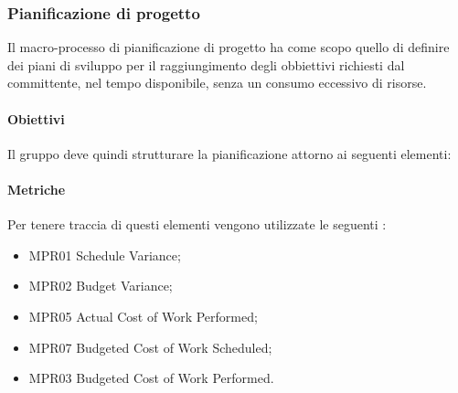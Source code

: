 \subsubsection{Pianificazione di progetto}
Il macro-processo di pianificazione di progetto ha come scopo quello di definire dei piani di sviluppo per il raggiungimento degli obbiettivi richiesti dal committente, nel tempo disponibile, senza un consumo eccessivo di risorse.

\paragraph{Obiettivi}
Il gruppo \gruppo{} deve quindi strutturare la pianificazione attorno ai seguenti elementi:

\paragraph{Metriche}%
Per tenere traccia di questi elementi vengono utilizzate le seguenti :
\begin{itemize}
\item MPR01 Schedule Variance;
\item MPR02 Budget Variance;
\item MPR05 Actual Cost of Work Performed;
\item MPR07 Budgeted Cost of Work Scheduled;
\item MPR03 Budgeted Cost of Work Performed.

\end{itemize}

